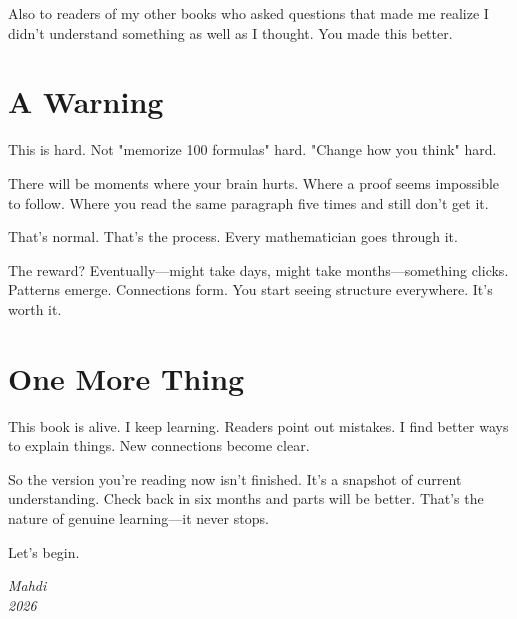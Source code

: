 Also to readers of my other books who asked questions that made me realize I didn't understand something as well as I thought. You made this better.

\section*{A Warning}

This is hard. Not "memorize 100 formulas" hard. "Change how you think" hard.

There will be moments where your brain hurts. Where a proof seems impossible to follow. Where you read the same paragraph five times and still don't get it.

That's normal. That's the process. Every mathematician goes through it.

The reward? Eventually—might take days, might take months—something clicks. Patterns emerge. Connections form. You start seeing structure everywhere. It's worth it.

\section*{One More Thing}

This book is alive. I keep learning. Readers point out mistakes. I find better ways to explain things. New connections become clear.

So the version you're reading now isn't finished. It's a snapshot of current understanding. Check back in six months and parts will be better. That's the nature of genuine learning—it never stops.

Let's begin.

\vfill
\begin{flushright}
\textit{Mahdi}\\
\textit{2026}
\end{flushright}

\clearpage